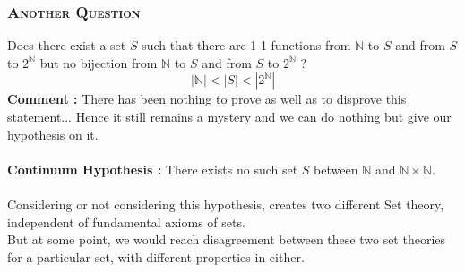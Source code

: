 \documentclass{article}
\begin{document}
\subsubsection*{\textsc{Another Question}}
Does there exist a set $S$ such that there are 1-1 functions from $\mathbb{N}$ to $S$ and from $S$ to $2^{\mathbb{N}}$ but no bijection from $\mathbb{N}$ to $S$ and from $S$ to $2^{\mathbb{N}}$ ?
\[|\mathbb{N}| < |S| < |2^{\mathbb{N}}|\]
\textbf{Comment :} There has been nothing to prove as well as to disprove this statement... Hence it still remains a mystery and we can do nothing but give our hypothesis on it.\\ \\
\textbf{Continuum Hypothesis :} There exists no such set $S$ between $\mathbb{N}$ and $\mathbb{N} \times \mathbb{N}$. \\ \\
Considering or not considering this hypothesis, creates two different Set theory, independent of fundamental axioms of sets.\\
But at some point, we would reach disagreement between these two set theories for a particular set, with different properties in either.
\end{document}
